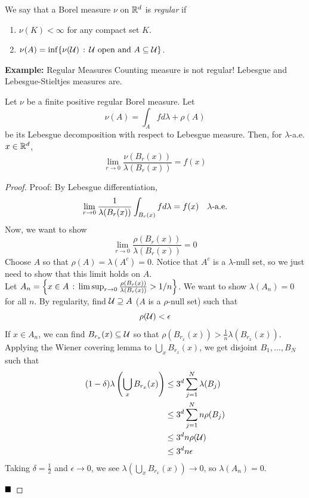 \begin{definition}
    We say that a Borel measure $\nu$ on $\R^d$ is \emph{regular} if
    \begin{enumerate}
        \item $\nu(K) < \infty$ for any compact set $K$.
        \item $\nu(A) = \inf\{\nu(\cal{U}) \col \cal{U} \tt{ open and } A \subseteq \cal{U}\}$.
    \end{enumerate}
\end{definition}

\begin{example}{\textbf{Example:} Regular Measures}
    Counting measure is not regular! Lebesgue and Lebesgue-Stieltjes measures are.
\end{example}

\begin{lemma}
    Let $\nu$ be a finite positive regular Borel measure. Let
    \[ \nu(A) = \int_{A} f d\lambda + \rho(A) \]
    be its Lebesgue decomposition with respect to Lebesgue measure. Then, for $\lambda$-a.e. $x \in \R^d$,
    \[ \lim_{r \to 0} \frac{\nu(B_r(x))}{\lambda(B_r(x))} = f(x) \]
\end{lemma}
\begin{proof}{Proof:}
    By Lebesgue differentiation,
    \[ \lim_{r \to 0} \frac{1}{\lambda(B_r(x))} \int_{B_r(x)} f d\lambda = f(x) \quad \lambda\tt{-a.e.} \]
    Now, we want to show
    \[ \lim_{r \to 0} \frac{\rho(B_r(x))}{\lambda(B_r(x))} = 0 \]
    Choose $A$ so that $\rho(A) = \lambda(A^{c}) = 0$. Notice that $A^{c}$ is a $\lambda$-null set, so we just need to show that this limit holds on $A$. \\

    Let $A_n = \left\{x \in A \col \limsup_{r \to 0} \frac{\rho(B_r(x))}{\lambda(B_r(x))} > 1/n\right\}$. We want to show $\lambda(A_n) = 0$ for all $n$. By regularity, find $\cal{U} \supseteq A$ ($A$ is a $\rho$-null set) such that
    \[ \rho(\cal{U}) < \epsilon \]
    If $x \in A_n$, we can find $B_{r_x}(x) \subseteq \cal{U}$ so that $\rho(B_{r_x}(x)) > \frac{1}{n}\lambda(B_{r_x}(x))$. Applying the Wiener covering lemma to $\bigcup_{x} B_{r_x}(x)$, we get disjoint $B_1, \ldots, B_N$ such that
    \begin{align*}
        (1 - \delta)\lambda\left(\bigcup_{x} B_{r_x}(x)\right) &\leq 3^d\sum_{j = 1}^{N} \lambda(B_j)\\
        &\leq 3^d\sum_{j = 1}^{N} n\rho(B_j)\\
        &\leq 3^d n\rho(\cal{U})\\
        &\leq 3^d n\epsilon
    \end{align*}
    Taking $\delta = \frac{1}{2}$ and $\epsilon \to 0$, we see $\lambda\left(\bigcup_{x} B_{r_x}(x)\right) \to 0$, so $\lambda(A_n) = 0$.

    $\qed$
\end{proof}
